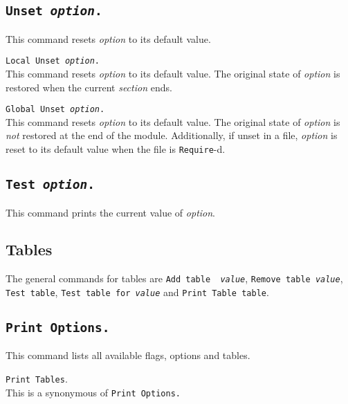 \subsection[\tt Unset {\rm\sl option}.]{\tt Unset {\rm\sl option}.}
This command resets {\rm\sl option} to its default value.

\begin{Variants}
\item {\tt Local Unset {\rm\sl option}.}\\
This command resets {\rm\sl option} to its default value. The original state of {\rm\sl option}
is restored when the current \emph{section} ends.
\item {\tt Global Unset {\rm\sl option}.}\\
This command resets {\rm\sl option} to its default value.  The original state of
{\rm\sl option} is \emph{not} restored at the end of the module. Additionally,
if unset in a file, {\rm\sl option} is reset to its default value when the file is
{\tt Require}-d.
\end{Variants}

\subsection[\tt Test {\rm\sl option}.]{\tt Test {\rm\sl option}.}
This command prints the current value of {\rm\sl option}.

\subsection{Tables}
The general commands for tables are {\tt Add {\rm\sf table} {\rm\sl
    value}}, {\tt Remove {\rm\sf table} {\rm\sl value}}, {\tt Test
    {\rm\sf table}}, {\tt Test {\rm\sf table} for {\rm\sl value}} and
  {\tt Print Table {\rm\sf table}}.

\subsection[\tt Print Options.]{\tt Print Options.}
This command lists all available flags, options and tables.

\begin{Variants}
\item {\tt Print Tables}.\\
This is a synonymous of {\tt Print Options.}
\end{Variants}

